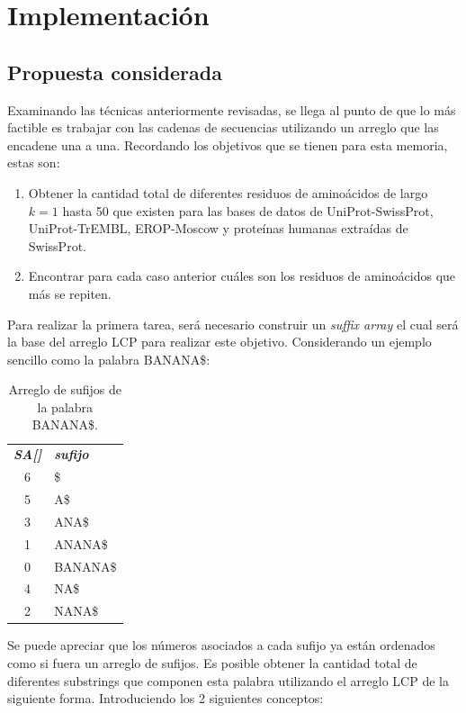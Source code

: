\chapter{Implementación}

\section{Propuesta considerada}

Examinando las técnicas anteriormente revisadas, se llega al punto de que lo más factible es trabajar con las cadenas de secuencias utilizando un arreglo que las encadene una a una. Recordando los objetivos que se tienen para esta memoria, estas son:

\begin{enumerate}
\item Obtener la cantidad total de diferentes residuos de aminoácidos de largo $k = 1$ hasta 50 que existen para las bases de datos de UniProt-SwissProt, UniProt-TrEMBL, EROP-Moscow y proteínas humanas extraídas de SwissProt.
\item Encontrar para cada caso anterior cuáles son los residuos de aminoácidos que más se repiten.
\end{enumerate}

Para realizar la primera tarea, será necesario construir un \textit{suffix array} el cual será la base del arreglo LCP para realizar este objetivo. Considerando un ejemplo sencillo como la palabra BANANA\$:

\begin{table}[H]
	\centering
	\begin{tabular}{c l}
		\textit{\textbf{SA[]}} & \textit{\textbf{sufijo}}\\
		6 & \$\\
		5 & A\$\\
		3 & ANA\$\\
		1 & ANANA\$\\
		0 & BANANA\$\\
		4 & NA\$\\
		2 & NANA\$\\
	\end{tabular}
	\caption{Arreglo de sufijos de la palabra BANANA\$.}
\end{table}

Se puede apreciar que los números asociados a cada sufijo ya están ordenados como si fuera un arreglo de sufijos. Es posible obtener la cantidad total de diferentes substrings que componen esta palabra utilizando el arreglo LCP de la siguiente forma. Introduciendo los 2 siguientes conceptos:


